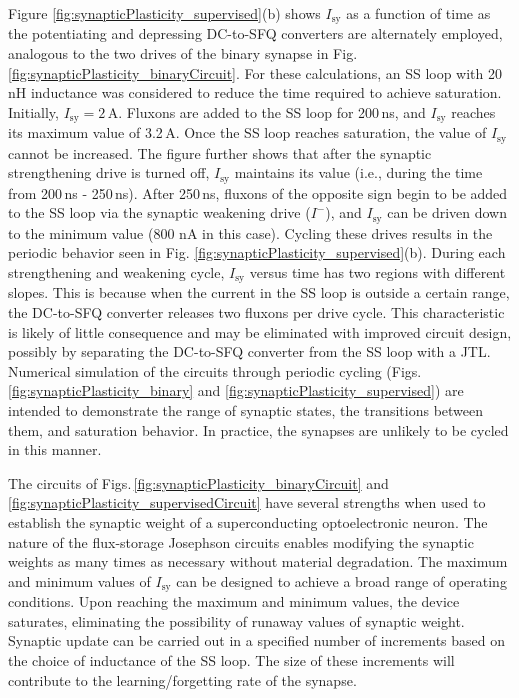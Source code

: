 \documentclass[twocolumn]{article}
\begin{document}
Figure \ref{fig:synapticPlasticity_supervised}(b) shows $I_{\mathrm{sy}}$ as a function of time as the potentiating and depressing DC-to-SFQ converters are alternately employed, analogous to the two drives of the binary synapse in Fig. \ref{fig:synapticPlasticity_binaryCircuit}. For these calculations, an SS loop with 20\,nH inductance was considered to reduce the time required to achieve saturation. Initially, $I_{\mathrm{sy}} = 2$\,\textmu A. Fluxons are added to the SS loop for 200\,ns, and $I_{\mathrm{sy}}$ reaches its maximum value of 3.2\,\textmu A. Once the SS loop reaches saturation, the value of $I_{\mathrm{sy}}$ cannot be increased. The figure further shows that after the synaptic strengthening drive is turned off, $I_{\mathrm{sy}}$ maintains its value (i.e., during the time from 200\,ns - 250\,ns). After 250\,ns, fluxons of the opposite sign begin to be added to the SS loop via the synaptic weakening drive ($I^-$), and $I_{\mathrm{sy}}$ can be driven down to the minimum value (800 nA in this case). Cycling these drives results in the periodic behavior seen in Fig. \ref{fig:synapticPlasticity_supervised}(b). During each strengthening and weakening cycle, $I_{\mathrm{sy}}$ versus time has two regions with different slopes. This is because when the current in the SS loop is outside a certain range, the DC-to-SFQ converter releases two fluxons per drive cycle. This characteristic is likely of little consequence and may be eliminated with improved circuit design, possibly by separating the DC-to-SFQ converter from the SS loop with a JTL. Numerical simulation of the circuits through periodic cycling (Figs.\,\ref{fig:synapticPlasticity_binary} and \ref{fig:synapticPlasticity_supervised}) are intended to demonstrate the range of synaptic states, the transitions between them, and saturation behavior. In practice, the synapses are unlikely to be cycled in this manner.

The circuits of Figs.\,\ref{fig:synapticPlasticity_binaryCircuit} and \ref{fig:synapticPlasticity_supervisedCircuit} have several strengths when used to establish the synaptic weight of a superconducting optoelectronic neuron. The nature of the flux-storage Josephson circuits enables modifying the synaptic weights as many times as necessary without material degradation. The maximum and minimum values of $I_{\mathrm{sy}}$ can be designed to achieve a broad range of operating conditions. Upon reaching the maximum and minimum values, the device saturates, eliminating the possibility of runaway values of synaptic weight. Synaptic update can be carried out in a specified number of increments based on the choice of inductance of the SS loop. The size of these increments will contribute to the learning/forgetting rate of the synapse. 
\end{document}
